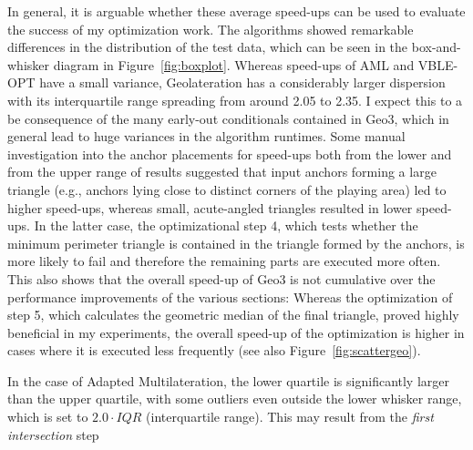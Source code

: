 In general, it is arguable whether these average speed-ups can be used to evaluate the success of my optimization work. The algorithms showed remarkable differences in the distribution of the test data, which can be seen in the box-and-whisker diagram in Figure~\ref{fig:boxplot}. Whereas speed-ups of AML and VBLE-OPT have a small variance, Geolateration has a considerably larger dispersion with its interquartile range spreading from around 2.05 to 2.35. I expect this to a be consequence of the many early-out conditionals contained in Geo3, which in general lead to huge variances in the algorithm runtimes. Some manual investigation into the anchor placements for speed-ups both from the lower and from the upper range of results suggested that input anchors forming a large triangle (e.g., anchors lying close to distinct corners of the playing area) led to higher speed-ups, whereas small, acute-angled triangles resulted in lower speed-ups. In the latter case, the optimizational step 4, which tests whether the minimum perimeter triangle is contained in the triangle formed by the anchors, is more likely to fail and therefore the remaining parts are executed more often. This also shows that the overall speed-up of Geo3 is not cumulative over the performance improvements of the various sections: Whereas the optimization of step 5, which calculates the geometric median of the final triangle, proved highly beneficial in my experiments, the overall speed-up of the optimization is higher in cases where it is executed less frequently (see also Figure~\ref{fig:scattergeo}).

In the case of Adapted Multilateration, the lower quartile is significantly larger than the upper quartile, with some outliers even outside the lower whisker range, which is set to $2.0 \cdot IQR$ (interquartile range). This may result from the \emph{first intersection} step

